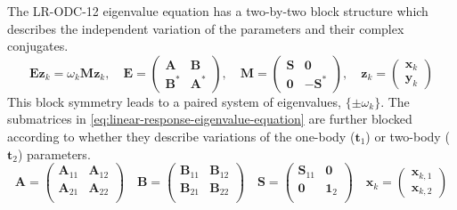 The LR-ODC-12 eigenvalue equation has a two-by-two block structure which
describes the independent variation of the parameters and their complex
conjugates.
\begin{equation}
    \label{eq:linear-response-eigenvalue-equation}
    \mathbf{E}\mathbf{z}_k
    =
    \omega_k
    \mathbf{M}\mathbf{z}_k
    ,
    \quad
    \mathbf{E}
    =
    \begin{pmatrix}
        \mathbf{A} & \mathbf{B} \\
        \mathbf{B}^* & \mathbf{A}^*
    \end{pmatrix}
    ,
    \quad
    \mathbf{M}
    =
    \begin{pmatrix}
        \mathbf{S} & \mathbf{0} \\
        \mathbf{0} & -\mathbf{S}^*
    \end{pmatrix}
    ,
    \quad
    \mathbf{z}_k
    =
    \begin{pmatrix}
        \mathbf{x}_k \\
        \mathbf{y}_k
    \end{pmatrix}
\end{equation}
This block symmetry leads to a paired system of eigenvalues,
\(
    \{\pm\omega_k\}
\).
The submatrices in \cref{eq:linear-response-eigenvalue-equation} are further
blocked according to whether they describe variations of the one-body
(\(\mathbf{t}_1\)) or two-body (\(\mathbf{t}_2\)) parameters.
\begin{equation}
    \label{eq:conjugate-blocks}
    \mathbf{A}
    =
    \begin{pmatrix}
        \mathbf{A}_{11} & \mathbf{A}_{12} \\
        \mathbf{A}_{21} & \mathbf{A}_{22} \\
    \end{pmatrix}
    \quad
    \mathbf{B}
    =
    \begin{pmatrix}
        \mathbf{B}_{11} & \mathbf{B}_{12} \\
        \mathbf{B}_{21} & \mathbf{B}_{22} \\
    \end{pmatrix}
    \quad
    \mathbf{S}
    =
    \begin{pmatrix}
        \mathbf{S}_{11} & \mathbf{0} \\
        \mathbf{0} & \mathbf{1}_2 \\
    \end{pmatrix}
    \quad
    \mathbf{x}_k
    =
    \begin{pmatrix}
        \mathbf{x}_{k,1} \\
        \mathbf{x}_{k,2}
    \end{pmatrix}
\end{equation}
